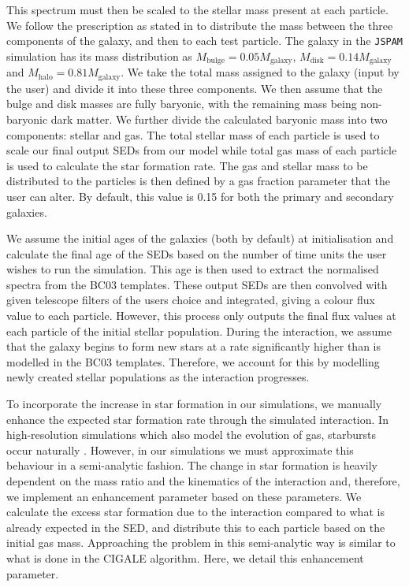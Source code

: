 This spectrum must then be scaled to the stellar mass present at each particle. We follow the prescription as stated in \citet{2016A&C....16...26W} to distribute the mass between the three components of the galaxy, and then to each test particle. The galaxy in the \texttt{JSPAM} simulation has its mass distribution as $M_{\text{bulge}} = 0.05M_{\text{galaxy}}$, $M_{\text{disk}} = 0.14M_{\text{galaxy}}$ and $M_{\text{halo}} = 0.81M_{\text{galaxy}}$. We take the total mass assigned to the galaxy (input by the user) and divide it into these three components. We then assume that the bulge and disk masses are fully baryonic, with the remaining mass being non-baryonic dark matter. We further divide the calculated baryonic mass into two components: stellar and gas. The total stellar mass of each particle is used to scale our final output SEDs from our model while total gas mass of each particle is used to calculate the star formation rate. The gas and stellar mass to be distributed to the particles is then defined by a gas fraction parameter that the user can alter. By default, this value is 0.15 for both the primary and secondary galaxies.

We assume the initial ages of the galaxies (both \DIFdelbegin {}\DIFdelend \DIFaddbegin {}\DIFaddend by default) at initialisation and calculate the final age of the SEDs based on the number of time units the user wishes to run the simulation. This age is then used to extract the normalised spectra from the BC03 templates. These output SEDs are then convolved with given telescope filters of the users choice and integrated, giving a colour flux value to each particle. However, this process only outputs the final flux values at each particle of the initial stellar population. During the interaction, we assume that the galaxy begins to form new stars at a rate significantly higher than is modelled in the BC03 templates. Therefore, we account for this by modelling newly created stellar populations as the interaction progresses.

To incorporate the increase in star formation in our simulations, we manually enhance the expected star formation rate through the simulated interaction. In high-resolution simulations which also model the evolution of gas, starbursts occur naturally \citep{2009PASJ...61..481S}. However, in our simulations we must approximate this behaviour in a semi-analytic fashion. The change in star formation is heavily dependent on the mass ratio and the kinematics of the interaction and, therefore, we implement an enhancement parameter based on these parameters. We calculate the excess star formation due to the interaction compared to what is already expected in the SED, and distribute this to each particle based on the initial gas mass. Approaching the problem in this semi-analytic way is similar to what is done in the CIGALE \citep{2019A&A...622A.103B} algorithm. Here, we detail this enhancement parameter.

